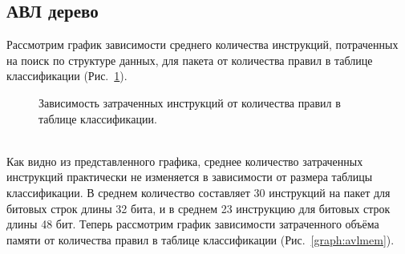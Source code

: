 \documentclass[a4paper, 12pt, titlepage, finall]{extreport}
\begin{document}
        \subsection{АВЛ дерево}
            Рассмотрим график зависимости среднего количества инструкций, потраченных на поиск по структуре данных, для пакета от количества правил в таблице классификации (Рис.~\ref{graph:avlinst}).
            \begin{figure}[ht]
                \centering
                \captionsetup{justification=centering}
                \caption{Зависимость затраченных инструкций от количества правил в таблице классификации.}
                \label{graph:avlinst}
            \end{figure}
            \\
            Как видно из представленного графика, среднее количество затраченных инструкций практически не изменяется в зависимости от размера таблицы классификации. 
            В среднем количество составляет 30 инструкций на пакет для битовых строк длины 32 бита, и в среднем 23 инструкцию для битовых строк длины 48 бит.
            Теперь рассмотрим график зависимости затраченного объёма памяти от количества правил в таблице классификации (Рис.~\ref{graph:avlmem}).
            \\
\end{document}
